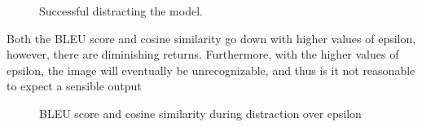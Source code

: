 \begin{figure}[ht]
{        \label{fig:attention_clean_field}
    }
    \vspace{\floatsep}
    \caption{Successful distracting the model.}
    \label{fig:distract_field_all}
\end{figure}

Both the BLEU score and cosine similarity go down with higher values of epsilon, however, there are diminishing returns. Furthermore, with the higher values of epsilon, the image will eventually be unrecognizable, and thus is it not reasonable to expect a sensible output

\begin{figure}[h]
    \vspace{\floatsep}
    \caption{BLEU score and cosine similarity during distraction over epsilon}
\end{figure}
